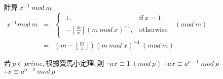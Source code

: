 \begin{itemize}

    $計算 \ x^{-1} \ mod \ m$
    $\begin{array}{rcl}
        x^{-1} mod \ m & = & \begin{cases} \begin{array}{cl}
                        1, & \text{if} \ x=1 \\
                        -\left \lfloor\frac{m}{x} \right\rfloor(m \ mod \ x)^{-1}, & \text{otherwise}
                     \end{array} \end{cases} \ (mod \ m) \\
               & = & (m-\left \lfloor\frac{m}{x} \right\rfloor)(m \ mod \ x)^{-1} \ (mod \ m)
     \end{array}$
 
    $若 \ p \in prime, 根據費馬小定理, 則$
    $\because ax \equiv 1 \ (mod \ p)$
    $\therefore ax \equiv a^{p-1} \ mod \ p$
    $\therefore x \equiv a^{p-2} \ mod \ p$ 
    
\end{itemize}